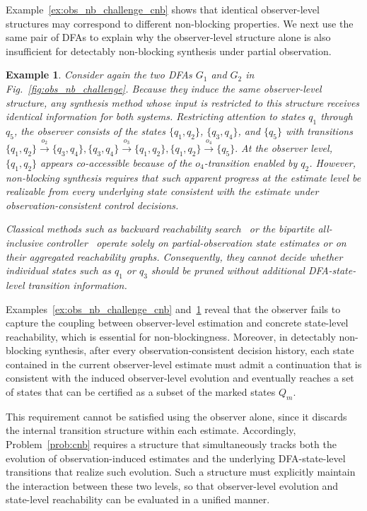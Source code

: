 \documentclass[twocolumn]{autart}
\newtheorem{myexm}{Example}
\begin{document}
Example~\ref{ex:obs_nb_challenge_cnb} shows that identical observer-level structures may correspond to different non-blocking properties.
We next use the same pair of DFAs to explain why the observer-level structure alone is also insufficient for detectably non-blocking synthesis under partial observation.

\begin{myexm}\label{ex:obs_based_structure_insufficient}
Consider again the two DFAs $G_1$ and $G_2$ in Fig.~\ref{fig:obs_nb_challenge}.
Because they induce the same observer-level structure, any synthesis method whose input is restricted to this structure receives identical information for both systems.
%
Restricting attention to states $q_1$ through $q_5$, the observer consists of the states $\{q_1, q_2\}$, $\{q_3, q_4\}$, and $\{q_5\}$ with transitions
$
\{q_1,q_2\} \xrightarrow{o_2} \{q_3,q_4\},
\{q_3,q_4\} \xrightarrow{o_3} \{q_1,q_2\},
\{q_1,q_2\} \xrightarrow{o_4} \{q_5\}.
$
At the observer level, $\{q_1, q_2\}$ appears co-accessible because of the $o_4$-transition enabled by $q_2$.
However, non-blocking synthesis requires that such apparent progress at the estimate level be realizable from every underlying state consistent with the estimate under observation-consistent control decisions.

Classical methods such as backward reachability search~\cite{thuijsman2020transformational,thuijsman2024reducing} or the bipartite all-inclusive controller~\cite{yin2016synthesis} operate solely on partial-observation state estimates or on their aggregated reachability graphs.
%
Consequently, they cannot decide whether individual states such as $q_1$ or $q_3$ should be pruned without additional DFA-state-level transition information.

\end{myexm}

Examples~\ref{ex:obs_nb_challenge_cnb} and~\ref{ex:obs_based_structure_insufficient} reveal that the observer fails to capture the coupling between observer-level estimation and concrete state-level reachability, which is essential for non-blockingness.
%
Moreover, in detectably non-blocking synthesis, after every observation-consistent decision history, each state contained in the current observer-level estimate must admit a continuation that is consistent with the induced observer-level evolution and eventually reaches a set of states that can be certified as a subset of the marked states $Q_m$.

This requirement cannot be satisfied using the observer alone, since it discards the internal transition structure within each estimate.
%
Accordingly, Problem~\ref{prob:cnb} requires a structure that simultaneously tracks both the evolution of observation-induced estimates and the underlying DFA-state-level transitions that realize such evolution.
%
Such a structure must explicitly maintain the interaction between these two levels, so that observer-level evolution and state-level reachability can be evaluated in a unified manner.
 
\end{document}
